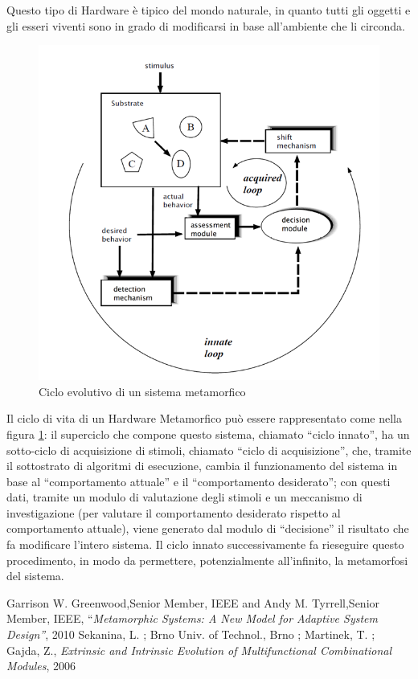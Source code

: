 \documentclass[11pt]{article} %
\begin{document}
Questo tipo di Hardware è tipico del mondo naturale, in quanto tutti gli oggetti e gli esseri viventi sono in grado di modificarsi in base all'ambiente che li circonda.

\begin{figure}
\centering
\includegraphics[scale=0.8]{ciclo_evolutivo.png}
\caption{Ciclo evolutivo di un sistema metamorfico}\label{fig:1}
\end{figure}

Il ciclo di vita di un Hardware Metamorfico può essere rappresentato come nella figura \ref{fig:1}: il superciclo che compone questo sistema, chiamato ``ciclo innato'', ha un sotto-ciclo di acquisizione di stimoli, chiamato ``ciclo di acquisizione'', che, tramite il sottostrato di algoritmi di esecuzione, cambia il funzionamento del sistema in base al ``comportamento attuale'' e il ``comportamento desiderato''; con questi dati, tramite un modulo di valutazione degli stimoli e un meccanismo di investigazione (per valutare il comportamento desiderato rispetto al comportamento attuale), viene generato dal modulo di ``decisione'' il risultato che fa modificare l'intero sistema. Il ciclo innato successivamente fa rieseguire questo procedimento, in modo da permettere, potenzialmente all'infinito, la metamorfosi del sistema.


\begin{thebibliography}{1}
 Garrison W. Greenwood,Senior Member, IEEE and Andy M. Tyrrell,Senior Member, IEEE, ``\textit{Metamorphic Systems: A New Model for Adaptive System Design''}, 2010
 Sekanina, L. ; Brno Univ. of Technol., Brno ; Martinek, T. ; Gajda, Z., \textit{Extrinsic and Intrinsic Evolution of Multifunctional Combinational Modules}, 2006
\end{thebibliography}
\end{document}
